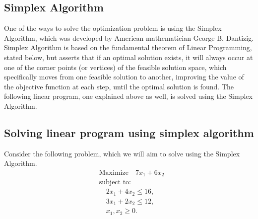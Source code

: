 \subsection{Simplex Algorithm}

One of the ways to solve the optimization problem is using the Simplex Algorithm, which was developed by American mathematician George B. Dantizig. Simplex Algorithm is based on the fundamental theorem of Linear Programming, stated below, but asserts that if an optimal solution exists, it will always occur at one of the corner points (or vertices) of the feasible solution space, which specifically moves from one feasible solution to another, improving the value of the objective function at each step, until the optimal solution is found. The following linear program, one explained above as well, is solved using the Simplex Algorithm.

\subsection{Solving linear program using simplex algorithm}

Consider the following problem, which we will aim to solve using the Simplex Algorithm. \cite{SimplexAlgorithmYouTube}
\[
\begin{aligned}
    &\text{Maximize} \quad 7x_1 + 6x_2 \\
    &\text{subject to:} \\
    &\quad 2x_1 + 4x_2 \leq 16, \\
    &\quad 3x_1 + 2x_2 \leq 12, \\
    &\quad x_1, x_2 \geq 0.
\end{aligned}
\]

